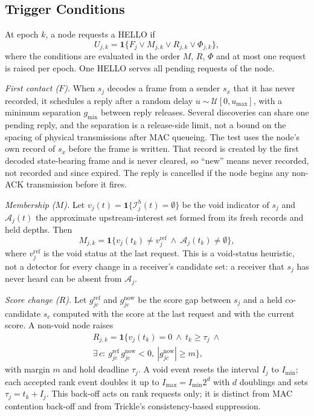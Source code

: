 \subsection{Trigger Conditions}
\label{sec:policy}
At epoch $k$, a node requests a HELLO if
\begin{equation}
U_{j,k}=\mathbf{1}\{F_j\vee M_{j,k}\vee R_{j,k}\vee \Phi_{j,k}\},
\label{eq:request}
\end{equation}
where the conditions are evaluated in the order $M$, $R$, $\Phi$ and at most one request is raised per epoch. One HELLO serves all pending requests of the node.

\emph{First contact ($F$).} When $s_j$ decodes a frame from a sender $s_x$ that it has never recorded, it schedules a reply after a random delay $u\sim\mathcal{U}[0,u_{\max}]$, with a minimum separation $g_{\min}$ between reply releases. Several discoveries can share one pending reply, and the separation is a release-side limit, not a bound on the spacing of physical transmissions after MAC queueing. The test uses the node's own record of $s_x$ before the frame is written. That record is created by the first decoded state-bearing frame and is never cleared, so ``new'' means never recorded, not recorded and since expired. The reply is cancelled if the node begins any non-ACK transmission before it fires.

\emph{Membership ($M$).} Let $v_j(t)=\mathbf{1}\{\mathcal{I}^h_j(t)=\emptyset\}$ be the void indicator of $s_j$ and $\mathcal{A}_j(t)$ the approximate upstream-interest set formed from its fresh records and held depths. Then
\begin{equation}
M_{j,k}=\mathbf{1}\{v_j(t_k)\neq v_j^{\mathrm{ref}}\ \wedge\ \mathcal{A}_j(t_k)\neq\emptyset\},
\label{eq:membership}
\end{equation}
where $v_j^{\mathrm{ref}}$ is the void status at the last request. This is a void-status heuristic, not a detector for every change in a receiver's candidate set: a receiver that $s_j$ has never heard can be absent from $\mathcal{A}_j$.

\emph{Score change ($R$).} Let $g^{\mathrm{ref}}_{jc}$ and $g^{\mathrm{now}}_{jc}$ be the score gap between $s_j$ and a held co-candidate $s_c$ computed with the score at the last request and with the current score. A non-void node raises
\begin{multline}
R_{j,k}=\mathbf{1}\{v_j(t_k)=0\ \wedge\ t_k\ge\tau_j\ \wedge\\
\exists\, c:\ g^{\mathrm{ref}}_{jc}\,g^{\mathrm{now}}_{jc}<0,\ |g^{\mathrm{now}}_{jc}|\ge m\},
\label{eq:rank}
\end{multline}
with margin $m$ and hold deadline $\tau_j$. A void event resets the interval $I_j$ to $I_{\min}$; each accepted rank event doubles it up to $I_{\max}=I_{\min}2^{d}$ with $d$ doublings and sets $\tau_j=t_k+I_j$. This back-off acts on rank requests only; it is distinct from MAC contention back-off and from Trickle's consistency-based suppression.

